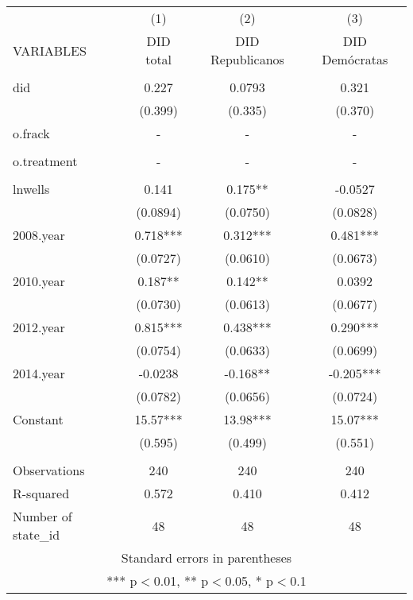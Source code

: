 \begin{tabular}{lccc} \hline
 & (1) & (2) & (3) \\
VARIABLES & DID total & DID Republicanos & DID Demócratas \\ \hline
 &  &  &  \\
did & 0.227 & 0.0793 & 0.321 \\
 & (0.399) & (0.335) & (0.370) \\
o.frack & - & - & - \\
 &  &  &  \\
o.treatment & - & - & - \\
 &  &  &  \\
lnwells & 0.141 & 0.175** & -0.0527 \\
 & (0.0894) & (0.0750) & (0.0828) \\
2008.year & 0.718*** & 0.312*** & 0.481*** \\
 & (0.0727) & (0.0610) & (0.0673) \\
2010.year & 0.187** & 0.142** & 0.0392 \\
 & (0.0730) & (0.0613) & (0.0677) \\
2012.year & 0.815*** & 0.438*** & 0.290*** \\
 & (0.0754) & (0.0633) & (0.0699) \\
2014.year & -0.0238 & -0.168** & -0.205*** \\
 & (0.0782) & (0.0656) & (0.0724) \\
Constant & 15.57*** & 13.98*** & 15.07*** \\
 & (0.595) & (0.499) & (0.551) \\
 &  &  &  \\
Observations & 240 & 240 & 240 \\
R-squared & 0.572 & 0.410 & 0.412 \\
 Number of state\_id & 48 & 48 & 48 \\ \hline
\multicolumn{4}{c}{ Standard errors in parentheses} \\
\multicolumn{4}{c}{ *** p$<$0.01, ** p$<$0.05, * p$<$0.1} \\
\end{tabular}
